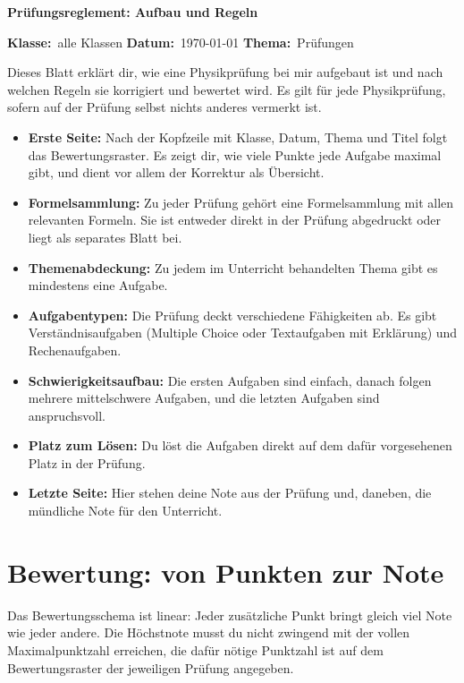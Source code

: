 \documentclass[11pt,a4paper]{article}
\newcommand{\Kopfzeile}[4]{%
  \begin{titlebox}
    {\color{white}\sffamily\bfseries\Large #4}
  \end{titlebox}
  \noindent\textbf{Klasse:}~#1 \hfill \textbf{Datum:}~#2 \hfill \textbf{Thema:}~#3
}
\begin{document}
\Kopfzeile{alle Klassen}{\today}{Prüfungen}{Prüfungsreglement: Aufbau und Regeln}

Dieses Blatt erklärt dir, wie eine Physikprüfung bei mir aufgebaut ist und
nach welchen Regeln sie korrigiert und bewertet wird. Es gilt für jede
Physikprüfung, sofern auf der Prüfung selbst nichts anderes vermerkt ist.

\begin{infobox}
\begin{itemize}
  \item \textbf{Erste Seite:} Nach der Kopfzeile mit Klasse, Datum, Thema
    und Titel folgt das Bewertungsraster. Es zeigt dir, wie viele Punkte
    jede Aufgabe maximal gibt, und dient vor allem der Korrektur als
    Übersicht.
  \item \textbf{Formelsammlung:} Zu jeder Prüfung gehört eine
    Formelsammlung mit allen relevanten Formeln. Sie ist entweder direkt
    in der Prüfung abgedruckt oder liegt als separates Blatt bei.
  \item \textbf{Themenabdeckung:} Zu jedem im Unterricht behandelten Thema
    gibt es mindestens eine Aufgabe.
  \item \textbf{Aufgabentypen:} Die Prüfung deckt verschiedene Fähigkeiten
    ab. Es gibt Verständnisaufgaben (Multiple Choice oder Textaufgaben mit
    Erklärung) und Rechenaufgaben.
  \item \textbf{Schwierigkeitsaufbau:} Die ersten Aufgaben sind einfach,
    danach folgen mehrere mittelschwere Aufgaben, und die letzten Aufgaben
    sind anspruchsvoll.
  \item \textbf{Platz zum Lösen:} Du löst die Aufgaben direkt auf dem
    dafür vorgesehenen Platz in der Prüfung.
  \item \textbf{Letzte Seite:} Hier stehen deine Note aus der Prüfung und,
    daneben, die mündliche Note für den Unterricht.
\end{itemize}
\end{infobox}

\section*{Bewertung: von Punkten zur Note}

Das Bewertungsschema ist linear: Jeder zusätzliche Punkt bringt gleich
viel Note wie jeder andere. Die Höchstnote musst du nicht zwingend mit der
vollen Maximalpunktzahl erreichen, die dafür nötige Punktzahl ist auf dem
Bewertungsraster der jeweiligen Prüfung angegeben.
\end{document}
